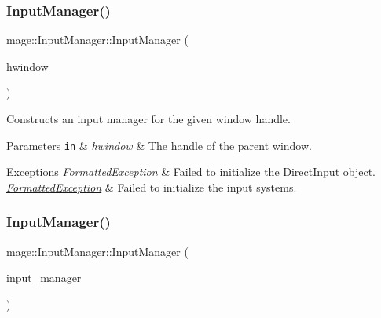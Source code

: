 \subsubsection{\texorpdfstring{Input\+Manager()}{InputManager()}\hspace{0.1cm}{\footnotesize\ttfamily [1/3]}}
{\footnotesize\ttfamily mage\+::\+Input\+Manager\+::\+Input\+Manager (\begin{DoxyParamCaption}\item[{H\+W\+ND}]{hwindow }\end{DoxyParamCaption})\hspace{0.3cm}{\ttfamily [explicit]}}

Constructs an input manager for the given window handle.


\begin{DoxyParams}[1]{Parameters}
\mbox{\tt in}  & {\em hwindow} & The handle of the parent window. \\
\hline
\end{DoxyParams}

\begin{DoxyExceptions}{Exceptions}
{\em \hyperlink{structmage_1_1_formatted_exception}{Formatted\+Exception}} & Failed to initialize the Direct\+Input object. \\
\hline
{\em \hyperlink{structmage_1_1_formatted_exception}{Formatted\+Exception}} & Failed to initialize the input systems. \\
\hline
\end{DoxyExceptions}
\hypertarget{classmage_1_1_input_manager_a68503617f418bf270dc39bb18019b46d}{}\label{classmage_1_1_input_manager_a68503617f418bf270dc39bb18019b46d} 
\subsubsection{\texorpdfstring{Input\+Manager()}{InputManager()}\hspace{0.1cm}{\footnotesize\ttfamily [2/3]}}
{\footnotesize\ttfamily mage\+::\+Input\+Manager\+::\+Input\+Manager (\begin{DoxyParamCaption}\item[{const \hyperlink{classmage_1_1_input_manager}{Input\+Manager} \&}]{input\+\_\+manager }\end{DoxyParamCaption})\hspace{0.3cm}{\ttfamily [delete]}}

